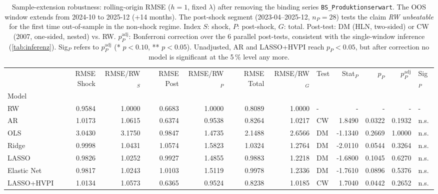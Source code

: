 \begin{table}
\caption{Sample-extension robustness: rolling-origin RMSE ($h=1$, fixed $\lambda$) after removing the binding series \texttt{BS\_Produktionserwart}. The OOS window extends from 2024-10 to 2025-12 (+14 months). The post-shock segment (2023-04--2025-12, $n_P=28$) tests the claim \emph{RW unbeatable} for the first time out-of-sample in the non-shock regime. Index $S$: shock, $P$: post-shock, $G$: total. Post-test: DM (HLN, two-sided) or CW (2007, one-sided, nested) vs. RW. $p_P^{\mathrm{adj}}$: Bonferroni correction over the 6 parallel post-tests, consistent with the single-window inference (\cref{tab:inferenz}). Sig$_P$ refers to $p_P^{\mathrm{adj}}$ (* $p<0.10$, ** $p<0.05$). Unadjusted, AR and LASSO+HVPI reach $p_P<0.05$, but after correction no model is significant at the 5\,\% level any more.}
\label{tab:robustheit_extended}
\begin{tabular}{lrrrrrrlrrrl}
\toprule
 & RMSE Shock & RMSE/RW$_{S}$ & RMSE Post & RMSE/RW$_{P}$ & RMSE Total & RMSE/RW$_{G}$ & Test & Stat$_P$ & $p_P$ & $p_P^{\mathrm{adj}}$ & Sig$_P$ \\
Model &  &  &  &  &  &  &  &  &  &  &  \\
\midrule
RW & 0.9584 & 1.0000 & 0.6683 & 1.0000 & 0.8089 & 1.0000 & - & - & - & - & - \\
AR & 1.0173 & 1.0615 & 0.6374 & 0.9538 & 0.8264 & 1.0217 & CW & 1.8490 & 0.0322 & 0.1932 & n.s. \\
OLS & 3.0430 & 3.1750 & 0.9847 & 1.4735 & 2.1488 & 2.6566 & DM & -1.1340 & 0.2669 & 1.0000 & n.s. \\
Ridge & 0.9998 & 1.0431 & 1.0574 & 1.5823 & 1.0324 & 1.2764 & DM & -2.0110 & 0.0544 & 0.3264 & n.s. \\
LASSO & 0.9826 & 1.0252 & 0.9927 & 1.4855 & 0.9883 & 1.2218 & DM & -1.6800 & 0.1045 & 0.6270 & n.s. \\
Elastic Net & 0.9817 & 1.0243 & 1.0103 & 1.5119 & 0.9978 & 1.2336 & DM & -1.7610 & 0.0896 & 0.5376 & n.s. \\
LASSO+HVPI & 1.0134 & 1.0573 & 0.6365 & 0.9524 & 0.8238 & 1.0185 & CW & 1.7040 & 0.0442 & 0.2652 & n.s. \\
\bottomrule
\end{tabular}
\end{table}
